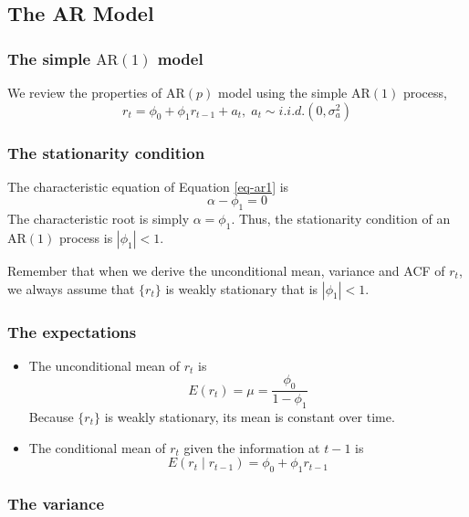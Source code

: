 \documentclass[a4paper,11pt]{article}
\begin{document}
\subsection{The AR Model}
\label{sec:orgc235294}

\subsubsection*{The simple \(\mathrm{AR}(1)\) model}
\label{sec:org3437d03}

We review the properties of \(\mathrm{AR}(p)\) model using the simple
\(\mathrm{AR}(1)\) process,
\begin{equation}
\label{eq-ar1}
r_t = \phi_0 + \phi_1 r_{t-1} + a_t,\; a_t \sim i.i.d.(0, \sigma^2_a)
\end{equation}

\subsubsection*{The stationarity condition}
\label{sec:org5fcd408}

The characteristic equation of Equation \eqref{eq-ar1} is
\[ \alpha - \phi_1 = 0 \]
The characteristic root is simply \(\alpha = \phi_1\). Thus, the
stationarity condition of an \(\mathrm{AR}(1)\) process is
\(|\phi_1|<1\).

Remember that when we derive the unconditional mean, variance and ACF
of \(r_t\), we always assume that \(\{r_t\}\) is weakly stationary that is
\(|\phi_1| < 1\).

\subsubsection*{The expectations}
\label{sec:org6de6ab9}

\begin{itemize}
\item The unconditional mean of \(r_t\) is
\[ E(r_t) = \mu = \frac{\phi_0}{1 - \phi_1} \]
Because \(\{r_t\}\) is weakly stationary, its mean is constant over
time.

\item The conditional mean of \(r_t\) given the information at \(t-1\) is
\[ E(r_t \mid r_{t-1}) = \phi_0 + \phi_1 r_{t-1} \]
\end{itemize}

\subsubsection*{The variance}
\label{sec:org89f00a8}
\end{document}
